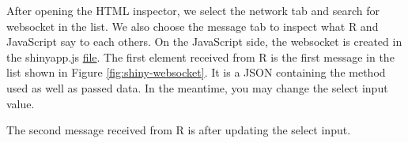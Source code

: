\documentclass[]{book}
\newenvironment{Shaded}{\begin{snugshade}}{\end{snugshade}}
\newcommand{\AttributeTok}[1]{\textcolor[rgb]{0.77,0.63,0.00}{#1}}
\newcommand{\ControlFlowTok}[1]{\textcolor[rgb]{0.13,0.29,0.53}{\textbf{#1}}}
\newcommand{\DataTypeTok}[1]{\textcolor[rgb]{0.13,0.29,0.53}{#1}}
\newcommand{\KeywordTok}[1]{\textcolor[rgb]{0.13,0.29,0.53}{\textbf{#1}}}
\newcommand{\NormalTok}[1]{#1}
\newcommand{\OperatorTok}[1]{\textcolor[rgb]{0.81,0.36,0.00}{\textbf{#1}}}
\newcommand{\OtherTok}[1]{\textcolor[rgb]{0.56,0.35,0.01}{#1}}
\newcommand{\StringTok}[1]{\textcolor[rgb]{0.31,0.60,0.02}{#1}}
\newcommand{\VariableTok}[1]{\textcolor[rgb]{0.00,0.00,0.00}{#1}}
\begin{document}
\begin{Shaded}
\end{Shaded}

After opening the HTML inspector, we select the network tab and search for websocket in the list. We also choose the message tab to inspect what R and JavaScript say to each others. On the JavaScript side, the websocket is created in the shinyapp.js \href{https://github.com/rstudio/shiny/blob/master/srcjs/shinyapp.js}{file}. The first element received from R is the first message in the list shown in Figure \ref{fig:shiny-websocket}. It is a JSON containing the method used as well as passed data. In the meantime, you may change the select input value.

\begin{Shaded}
\end{Shaded}

The second message received from R is after updating the select input.
\end{document}

